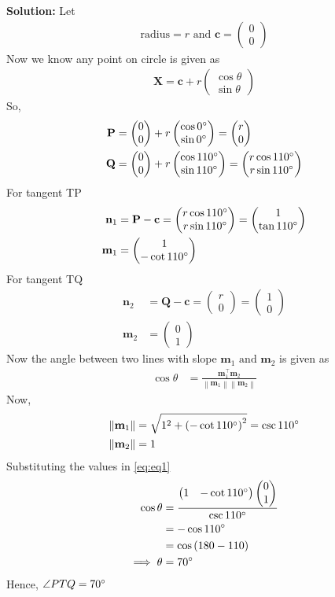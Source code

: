 \documentclass[12pt]{article}
\providecommand{\brak}[1]{\ensuremath{\left(#1\right)}}
\providecommand{\norm}[1]{\left\lVert#1\right\rVert}
\newcommand{\solution}{\noindent \textbf{Solution: }}
\newcommand{\myvec}[1]{\ensuremath{\begin{pmatrix}#1\end{pmatrix}}}
\let\vec\mathbf
\begin{document}
\solution
Let
\begin{align}
	\text{radius} = r \text{ and } \vec{c} = \myvec{0\\0}
\end{align}
Now we know any point on circle is given as
\begin{align}
	\vec{X} = \vec{c}+r\myvec{\cos\theta \\ \sin\theta}
\end{align}
So,
\begin{align}
	\vec{P} &= \myvec{0\\0}+r\myvec{\cos0\degree\\\sin0\degree} = \myvec{r\\0}\\
	\vec{Q} &= \myvec{0\\0}+r\myvec{\cos110\degree\\\sin110\degree} = \myvec{r\cos110\degree\\r\sin110\degree}
\end{align}
For tangent TP
\begin{align}
	\vec{n}_1 &= \vec{P}-\vec{c} = \myvec{r\cos110\degree\\r\sin110\degree} = \myvec{1\\\tan110\degree}\\
	\vec{m}_1 &= \myvec{1\\-\cot110\degree}
\end{align}
For tangent TQ
\begin{align}
	\vec{n}_2 &= \vec{Q}-\vec{c} = \myvec{r\\0} = \myvec{1\\0}\\
	\vec{m}_2 &= \myvec{0\\1}
\end{align}
Now the angle between two lines with slope $\vec{m}_1 \text{ and } \vec{m}_2$ is given as
\begin{align}
	\label{eq:eq1}
	\cos\theta &= \frac{\vec{m}_1^\top \vec{m}_2}{\norm{\vec{m}_1}\norm{\vec{m}_2}}
\end{align}
Now,
\begin{align}
	\norm{\vec{m}_1} &= \sqrt{1^2 + \brak{-\cot110\degree}^2} = \csc110\degree\\
	\norm{\vec{m}_2} &= 1
\end{align}
Substituting the values in \eqref{eq:eq1}
\begin{align}
	\cos\theta &= \frac{\myvec{1&-\cot110\degree}\myvec{0\\1}}{\csc110\degree}\\
	&= -\cos110\degree\\
	&= \cos \brak{180-110}\\
	\implies \theta &= 70\degree
\end{align}
Hence, $\angle{PTQ} = 70\degree$ 
\end{document}
